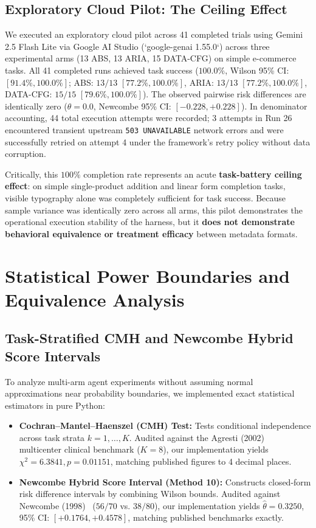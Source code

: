\documentclass[11pt,a4paper]{article}
\begin{document}
\subsection{Exploratory Cloud Pilot: The Ceiling Effect}
We executed an exploratory cloud pilot across 41 completed trials using Gemini 2.5 Flash Lite via Google AI Studio (`google-genai 1.55.0`) across three experimental arms (13 ABS, 13 ARIA, 15 DATA-CFG) on simple e-commerce tasks. All 41 completed runs achieved task success ($100.0\%$, Wilson 95\% CI: $[91.4\%, 100.0\%]$; ABS: $13/13$ $[77.2\%, 100.0\%]$, ARIA: $13/13$ $[77.2\%, 100.0\%]$, DATA-CFG: $15/15$ $[79.6\%, 100.0\%]$). The observed pairwise risk differences are identically zero ($\hat{\theta} = 0.0$, Newcombe 95\% CI: $[-0.228, +0.228]$). In denominator accounting, 44 total execution attempts were recorded; 3 attempts in Run 26 encountered transient upstream \texttt{503 UNAVAILABLE} network errors and were successfully retried on attempt 4 under the framework's retry policy without data corruption.

Critically, this $100\%$ completion rate represents an acute \textbf{task-battery ceiling effect}: on simple single-product addition and linear form completion tasks, visible typography alone was completely sufficient for task success. Because sample variance was identically zero across all arms, this pilot demonstrates the operational execution stability of the harness, but it \textbf{does not demonstrate behavioral equivalence or treatment efficacy} between metadata formats.

\section{Statistical Power Boundaries and Equivalence Analysis}
\label{sec:power}

\subsection{Task-Stratified CMH and Newcombe Hybrid Score Intervals}
To analyze multi-arm agent experiments without assuming normal approximations near probability boundaries, we implemented exact statistical estimators in pure Python:
\begin{itemize}
    \item \textbf{Cochran--Mantel--Haenszel (CMH) Test:} Tests conditional independence across task strata $k=1, \dots, K$. Audited against the Agresti (2002)~\cite{agresti2002categorical} multicenter clinical benchmark ($K=8$), our implementation yields $\chi^2 = 6.3841, p = 0.01151$, matching published figures to 4 decimal places.
    \item \textbf{Newcombe Hybrid Score Interval (Method 10):} Constructs closed-form risk difference intervals by combining Wilson bounds. Audited against Newcombe (1998)~\cite{newcombe1998interval} ($56/70$ vs. $38/80$), our implementation yields $\hat{\theta} = 0.3250$, 95\% CI: $[+0.1764, +0.4578]$, matching published benchmarks exactly.
\end{itemize}
\end{document}
